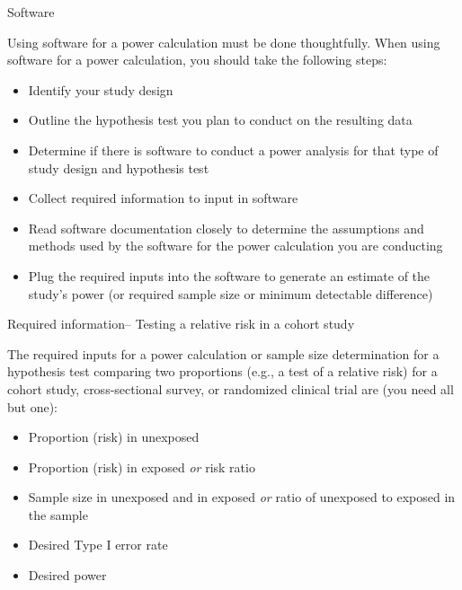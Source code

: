 \documentclass[ignorenonframetext,]{beamer}
\providecommand{\tightlist}{%
  \setlength{\itemsep}{0pt}\setlength{\parskip}{0pt}}
\begin{document}
\begin{frame}{Software}

Using software for a power calculation must be done thoughtfully. When
using software for a power calculation, you should take the following
steps:

\begin{itemize}
\tightlist
\item
  Identify your study design
\item
  Outline the hypothesis test you plan to conduct on the resulting data
\item
  Determine if there is software to conduct a power analysis for that
  type of study design and hypothesis test
\item
  Collect required information to input in software
\item
  Read software documentation closely to determine the assumptions and
  methods used by the software for the power calculation you are
  conducting
\item
  Plug the required inputs into the software to generate an estimate of
  the study's power (or required sample size or minimum detectable
  difference)
\end{itemize}

\end{frame}

\begin{frame}{Required information-- Testing a relative risk in a cohort
study}

The required inputs for a power calculation or sample size determination
for a hypothesis test comparing two proportions (e.g., a test of a
relative risk) for a cohort study, cross-sectional survey, or randomized
clinical trial are (you need all but one):

\begin{itemize}
\tightlist
\item
  Proportion (risk) in unexposed
\item
  Proportion (risk) in exposed \emph{or} risk ratio
\item
  Sample size in unexposed and in exposed \emph{or} ratio of unexposed
  to exposed in the sample
\item
  Desired Type I error rate
\item
  Desired power
\end{itemize}

\end{frame}
\end{document}
